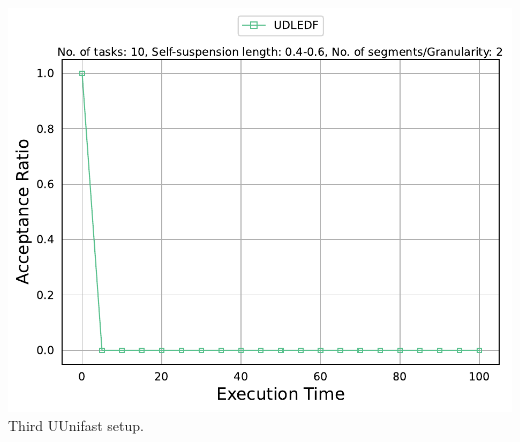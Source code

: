 \documentclass[]{article}
\begin{document}
\begin{minipage}[t]{0.48\linewidth}
		\includegraphics[width=\linewidth]{UDLEDF[2][0.4-0.6][10].pdf}
		Third UUnifast setup.
		\vspace{0.3cm}
		
		
	\end{minipage}\hfill
\end{document}

